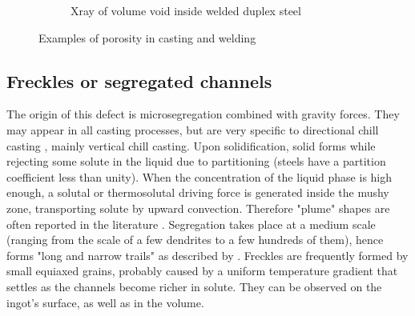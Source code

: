 \begin{figure}[h!]
\begin{subfigure}[t]{0.25\textwidth}
	\caption{Xray of volume void inside welded duplex steel}
    \label{fig:porosity4}
  \end{subfigure}
\caption{Examples of porosity in casting and welding} 
\label{fig:porosity}
\end{figure}
\subsection*{Freckles or segregated channels} 
The origin of this defect is microsegregation combined with gravity forces. They may appear 
in all casting processes, but are very specific to directional chill casting \citep{giamei_nature_1970}, mainly vertical chill casting.
Upon solidification, solid forms while rejecting some solute in the liquid due to partitioning (steels have a partition coefficient less than unity).
When the concentration of the liquid phase is high enough, a solutal or thermosolutal driving force is generated inside the mushy zone, transporting solute
by upward convection. Therefore "plume" shapes are often reported in the literature \citep{sarazin_studies_1992, schneider_modeling_1997}.
Segregation takes place at a medium scale (ranging from the scale of a few dendrites to a few hundreds of them), 
hence forms "long and narrow trails" as described by \citet{felicelli_simulation_1991}. Freckles are 
frequently formed by small equiaxed grains, probably caused by a uniform temperature gradient that settles as the channels become richer in solute. 
They can be observed on the ingot's surface, as well as in the volume.

